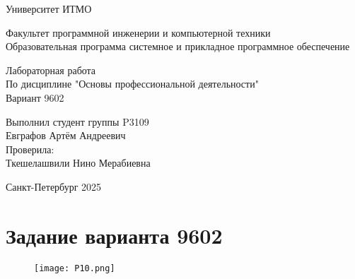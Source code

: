 

\thispagestyle{empty}
\begin{center}
\LARGE{Университет ИТМО} 
\vspace{20pt}

\LARGE{Факультет программной инженерии и компьютерной техники \\
Образовательная программа системное и прикладное программное обеспечение}
\vspace{160pt}

\LARGE{Лабораторная работа   \\
По дисциплине "Основы профессиональной деятельности" \\ 
Вариант 9602}
\vspace{120pt}
\end{center}

\begin{flushright}
\LARGE{Выполнил студент группы P3109 \\ 
Евграфов Артём Андреевич \\
Проверила: \\
Ткешелашвили Нино Мерабиевна}
\vspace{120pt}
\end{flushright}

\begin{center}
\Large{Санкт-Петербург 2025}
\end{center}

\newpage
\setcounter{page}{1}
\tableofcontents
\newpage
\section{Задание варианта 9602}
\begin{figure}[H]
    \centering
\texttt{[image: P10.png]}
\end{figure}
